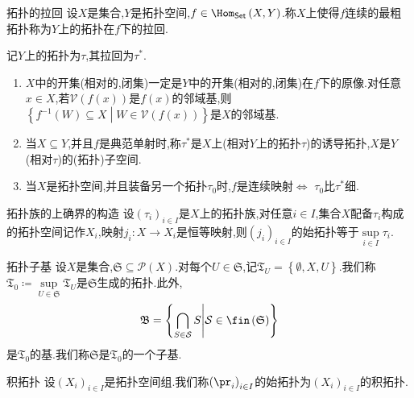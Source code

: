\begin{definition}{拓扑的拉回}{}
	设$X$是集合,$Y$是拓扑空间,$f\in\Hom_{\mathsf{Set}}\left(X,Y\right)$.称$X$上使得$f$连续的最粗拓扑称为$Y$上的拓扑在$f$下的拉回.
\end{definition}

\begin{remark}{}{}
	记$Y$上的拓扑为$\tau$,其拉回为$\tau^{\ast}$.
	\begin{enumerate}
		\item $X$中的开集(相对的,闭集)一定是$Y$中的开集(相对的,闭集)在$f$下的原像.对任意$x\in X$,若$\mathcal{V}\left(f\left(x\right)\right)$是$f\left(x\right)$的邻域基,则$\left\{f^{-1}\left(W\right)\subseteq X\middle|W\in\mathcal{V}\left(f\left(x\right)\right)\right\}$是$X$的邻域基.
		\item 当$X\subseteq Y$,并且$f$是典范单射时,称$\tau^{\ast}$是$X$上(相对$Y$上的拓扑$\tau$)的诱导拓扑,$X$是$Y$(相对$\tau$)的(拓扑)子空间.
		\item 当$X$是拓扑空间,并且装备另一个拓扑$\tau_{0}$时,$f$是连续映射$\iff$ $\tau_{0}$比$\tau^{\ast}$细.
	\end{enumerate}
\end{remark}

\begin{proposition}{拓扑族的上确界的构造}{}
	设$\left(\tau_{i}\right)_{i\in I}$是$X$上的拓扑族,对任意$i\in I$,集合$X$配备$\tau_{i}$构成的拓扑空间记作$X_{i}$,映射$j_{i}:X\to X_{i}$是恒等映射,则$\left(j_{i}\right)_{i\in I}$的始拓扑等于$\sup\limits_{i\in I}\tau_{i}$.
\end{proposition}

\begin{proposition}{拓扑子基}{}
	设$X$是集合,$\mathfrak{S}\subseteq\mathcal{P}\left(X\right)$.对每个$U\in\mathfrak{S}$,记$\mathfrak{T}_{U}=\left\{\emptyset,X,U\right\}$.我们称$\mathfrak{T}_{0}\coloneq\sup\limits_{U\in\mathfrak{S}}\mathfrak{T}_{U}$是$\mathfrak{S}$生成的拓扑.此外,
	\begin{align*}
		\mathfrak{B}=\left\{\bigcap\limits_{S\in\mathcal{S}}S\middle|\mathcal{S}\in\fin\left(\mathfrak{S}\right)\right\}
	\end{align*}
	是$\mathfrak{T}_{0}$的基.我们称$\mathfrak{S}$是$\mathfrak{T}_{0}$的一个子基.
\end{proposition}

\begin{definition}{积拓扑}{}
	设$\left(X_{i}\right)_{i\in I}$是拓扑空间组.我们称$\left(\pr_{i}\right)_{i\in I}$的始拓扑为$\left(X_{i}\right)_{i\in I}$的积拓扑.
\end{definition}
